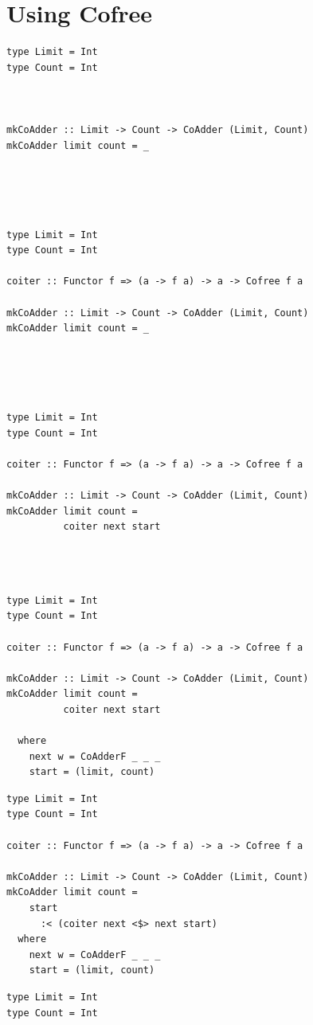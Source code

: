 \documentclass{beamer}
\begin{document}
\section{Using Cofree}

\begin{frame}[fragile]
  \begin{overprint}
  \begin{verbatim}
type Limit = Int
type Count = Int



mkCoAdder :: Limit -> Count -> CoAdder (Limit, Count)
mkCoAdder limit count = _





  \end{verbatim}
  \begin{verbatim}
type Limit = Int
type Count = Int

coiter :: Functor f => (a -> f a) -> a -> Cofree f a

mkCoAdder :: Limit -> Count -> CoAdder (Limit, Count)
mkCoAdder limit count = _





  \end{verbatim}
  \begin{verbatim}
type Limit = Int
type Count = Int

coiter :: Functor f => (a -> f a) -> a -> Cofree f a

mkCoAdder :: Limit -> Count -> CoAdder (Limit, Count)
mkCoAdder limit count =
          coiter next start




  \end{verbatim}
  \begin{verbatim}
type Limit = Int
type Count = Int

coiter :: Functor f => (a -> f a) -> a -> Cofree f a

mkCoAdder :: Limit -> Count -> CoAdder (Limit, Count)
mkCoAdder limit count =
          coiter next start

  where
    next w = CoAdderF _ _ _
    start = (limit, count)
  \end{verbatim}
  \begin{verbatim}
type Limit = Int
type Count = Int

coiter :: Functor f => (a -> f a) -> a -> Cofree f a

mkCoAdder :: Limit -> Count -> CoAdder (Limit, Count)
mkCoAdder limit count =
    start
      :< (coiter next <$> next start)
  where
    next w = CoAdderF _ _ _
    start = (limit, count)
  \end{verbatim}
  \begin{verbatim}
type Limit = Int
type Count = Int


\end{verbatim}
\end{overprint}
\end{frame}
\end{document}

